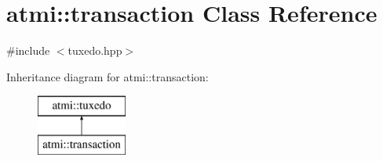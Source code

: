 \hypertarget{classatmi_1_1transaction}{\section{atmi\+:\+:transaction Class Reference}
\label{classatmi_1_1transaction}
}


{\ttfamily \#include $<$tuxedo.\+hpp$>$}

Inheritance diagram for atmi\+:\+:transaction\+:\begin{figure}[H]
\begin{center}
\leavevmode
\includegraphics[height=2.000000cm]{classatmi_1_1transaction}
\end{center}
\end{figure}
